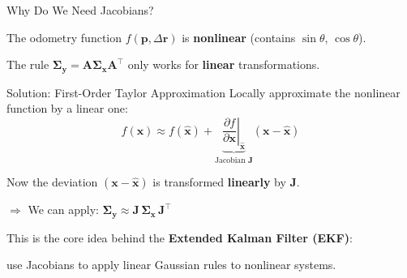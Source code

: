 \documentclass[aspectratio=169, 11pt]{beamer}
\newcommand{\T}{^{\top}}
\begin{document}
\begin{frame}{Why Do We Need Jacobians?}

The odometry function $f(\mathbf{p}, \Delta\mathbf{r})$ is \textbf{nonlinear} (contains $\sin\theta$, $\cos\theta$).

\vspace{4pt}

The rule $\bm{\Sigma}_{\mathbf{y}} = \mathbf{A}\bm{\Sigma}_{\mathbf{x}}\mathbf{A}\T$ only works for \textbf{linear} transformations.

\vspace{6pt}

\begin{alertblock}{Solution: First-Order Taylor Approximation}
Locally approximate the nonlinear function by a linear one:
$$f(\mathbf{x}) \approx f(\hat{\mathbf{x}}) + \underbrace{\left.\frac{\partial f}{\partial \mathbf{x}}\right|_{\hat{\mathbf{x}}}}_{\text{Jacobian } \mathbf{J}} (\mathbf{x} - \hat{\mathbf{x}})$$

Now the deviation $(\mathbf{x} - \hat{\mathbf{x}})$ is transformed \textbf{linearly} by $\mathbf{J}$.

$\Rightarrow$ We can apply: $\bm{\Sigma}_{\mathbf{y}} \approx \mathbf{J}\,\bm{\Sigma}_{\mathbf{x}}\,\mathbf{J}\T$
\end{alertblock}

\vspace{6pt}

This is the core idea behind the \textbf{Extended Kalman Filter (EKF)}:

use Jacobians to apply linear Gaussian rules to nonlinear systems.

\end{frame}
\end{document}
